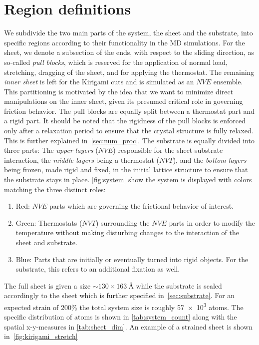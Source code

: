 \section{Region definitions}
We subdivide the two main parts of the system, the sheet and the substrate, into
specific regions according to their functionality in the \acrshort{MD}
simulations. For the sheet, we denote a subsection of the ends, with respect to
the sliding direction, as so-called \textit{pull blocks}, which is reserved for
the application of normal load, stretching, dragging of the sheet, and for
applying the thermostat. The remaining \textit{inner sheet} is left for the
Kirigami cuts and is simulated as an $NVE$ ensemble. This partitioning is motivated by the idea that we want to minimize direct manipulations on the inner sheet, given its presumed critical role in governing friction behavior. The pull blocks are
equally split between a thermostat part and a rigid part. It should be noted that the rigidness of the pull blocks is enforced only after a relaxation period to ensure that the crystal structure is fully relaxed. This is further explained in~\cref{sec:num_proc}. The substrate is equally divided into three parts: The
\textit{upper layers} ($NVE$) responsible for the sheet-substrate interaction,
the \textit{middle layers} being a thermostat ($NVT$), and the \textit{bottom
layers} being frozen, made rigid and fixed, in the initial lattice structure to
ensure that the substrate stays in place. \cref{fig:system} show the system is
displayed with colors matching the three distinct roles:
\begin{enumerate}
  \item Red: $NVE$ parts which are governing the frictional behavior of interest.
  \item Green: Thermostats ($NVT$) surrounding the $NVE$ parts in order to modify the temperature without making disturbing changes to the interaction of the sheet and substrate.
  \item Blue: Parts that are initially or eventually turned into rigid objects. For the substrate, this refers to an additional fixation as well.
\end{enumerate}
The full sheet is given a size $\sim 130 \times \SI{163}{\text{Å}}$ while the substrate is scaled accordingly to the sheet which is further specified in~\cref{sec:substrate}. For an expected strain of 200\% the total system size is roughly \num{57e3} atoms. The specific distribution of atoms is shown in \cref{tab:system_count} along with the spatial x-y-measures in \cref{tab:sheet_dim}. An example of a strained sheet is shown in~\cref{fig:kirigami_stretch}


